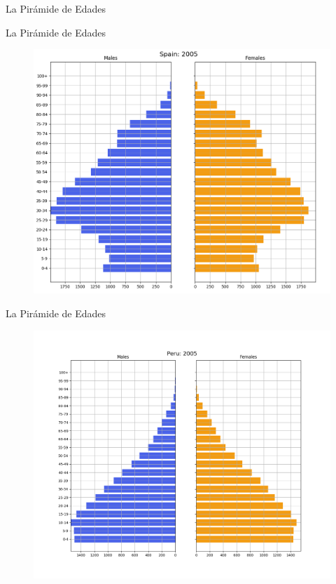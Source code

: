 \documentclass[8pt,a4paper]{beamer}
\begin{document}
{\begin{frame}{La Pirámide de Edades}
\end{frame}

\begin{frame}{La Pirámide de Edades}

\begin{figure}[hbtp]
\centering
\includegraphics[scale=0.30]{4.png}
\label{fig:5}
\end{figure}

\end{frame}

\begin{frame}{La Pirámide de Edades}

\begin{figure}[hbtp]
\centering
\includegraphics[scale=0.30]{5.png}
\label{fig:6}
\end{figure}


\end{frame}}
\end{document}
